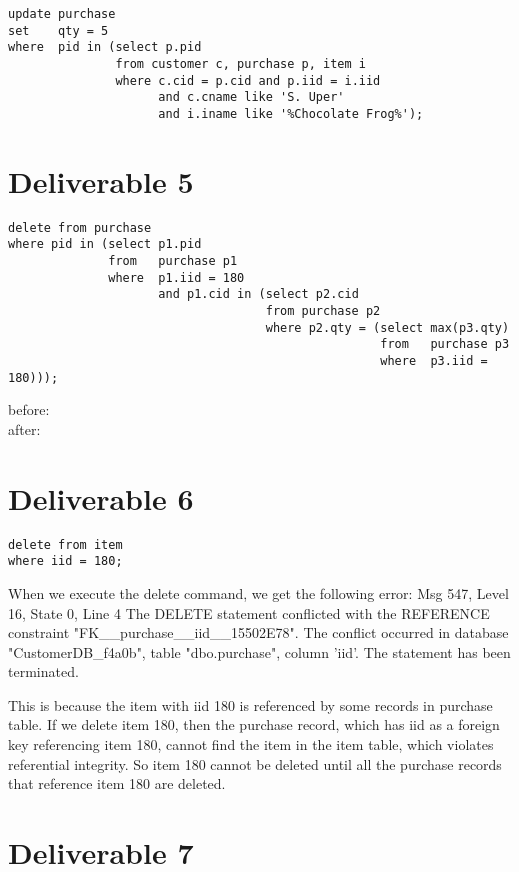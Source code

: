 \documentclass{article}
\begin{document}
\begin{verbatim}
update purchase
set    qty = 5
where  pid in (select p.pid
               from customer c, purchase p, item i
               where c.cid = p.cid and p.iid = i.iid
                     and c.cname like 'S. Uper'
                     and i.iname like '%Chocolate Frog%');
\end{verbatim}

\section{Deliverable 5}

\begin{verbatim}
delete from purchase
where pid in (select p1.pid
              from   purchase p1
              where  p1.iid = 180
                     and p1.cid in (select p2.cid
                                    from purchase p2
                                    where p2.qty = (select max(p3.qty)
                                                    from   purchase p3
                                                    where  p3.iid = 180)));
\end{verbatim}

\noindent before: \\


\noindent after: \\


\section{Deliverable 6}
\begin{verbatim}
delete from item
where iid = 180;
\end{verbatim}

When we execute the delete command, we get the following error: 
Msg 547, Level 16, State 0, Line 4
The DELETE statement conflicted with the REFERENCE constraint "FK__purchase__iid__15502E78". The conflict occurred in database "CustomerDB_f4a0b", table "dbo.purchase", column 'iid'.
The statement has been terminated.

This is because the item with iid 180 is referenced by some records in purchase table. If we delete item 180, then the purchase record, which has iid as a foreign key referencing item 180, cannot find the item in the item table, which violates referential integrity. So item 180 cannot be deleted until all the purchase records that reference item 180 are deleted.

\section{Deliverable 7}
\end{document}

